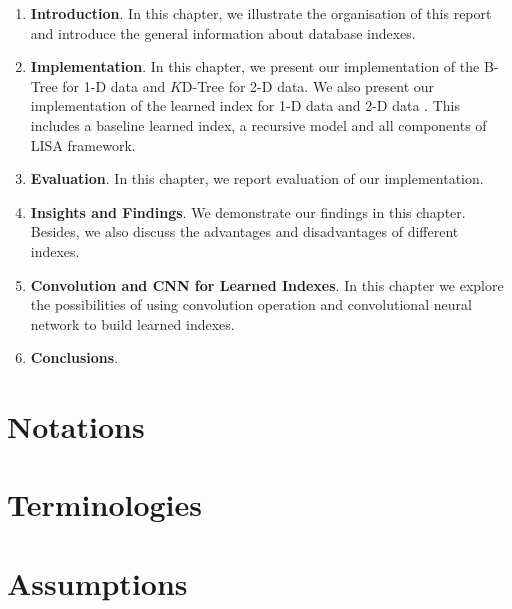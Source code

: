 \begin{enumerate}
	\item \textbf{Introduction}. In this chapter, we illustrate the organisation of this report and introduce the general information about database indexes.
	\item \textbf{Implementation}. In this chapter, we present our implementation of the B-Tree for 1-D data and $K$D-Tree for 2-D data. We also present our implementation of the learned index for 1-D data \cite{kraska2018case} and 2-D data \cite{li2020lisa}. This includes a baseline learned index, a recursive model and all components of LISA framework. 
	\item \textbf{Evaluation}. In this chapter, we report evaluation of our implementation. 
	\item \textbf{Insights and Findings}. We demonstrate our findings in this chapter. Besides, we also discuss the advantages and disadvantages of different indexes.
	\item \textbf{Convolution and CNN for Learned Indexes}. In this chapter we explore the possibilities of using convolution operation and convolutional neural network to build learned indexes.
	\item \textbf{Conclusions}. 
\end{enumerate}

\section{Notations}



\section{Terminologies}



\section{Assumptions}




